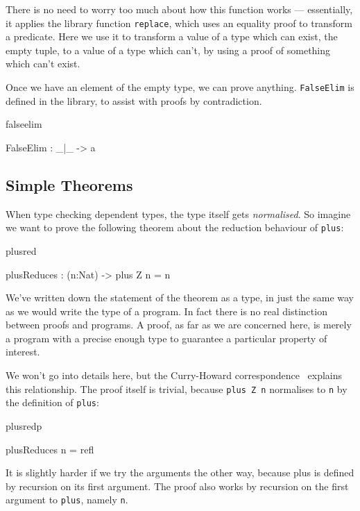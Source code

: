 \noindent
There is no need to worry too much about how this function works --- essentially,
it applies the library function \texttt{replace}, which uses an equality proof to 
transform a predicate. Here we use it to transform a value of a type which can exist,
the empty tuple, to a value of a type which can't, by using a proof of something
which can't exist.

Once we have an element of the empty type, we can prove anything. \texttt{FalseElim}
is defined in the library, to assist with proofs by contradiction.

\begin{SaveVerbatim}{falseelim}

FalseElim : _|_ -> a

\end{SaveVerbatim}

\subsection{Simple Theorems}

When type checking dependent types, the type itself gets \emph{normalised}. So imagine
we want to prove the following theorem about the reduction behaviour of \texttt{plus}:

\begin{SaveVerbatim}{plusred}

plusReduces : (n:Nat) -> plus Z n = n

\end{SaveVerbatim}

\noindent
We've written down the statement of the theorem as a type, in just the same way
as we would write the type of a program. In fact there is no real distinction
between proofs and programs. A proof, as far as we are concerned here, is
merely a program with a precise enough type to guarantee a particular property
of interest.

We won't go into details here, but the Curry-Howard
correspondence~\cite{howard} explains this relationship.
The proof itself is trivial, because \texttt{plus Z n} normalises to \texttt{n}
by the definition of \texttt{plus}:

\begin{SaveVerbatim}{plusredp}

plusReduces n = refl

\end{SaveVerbatim}

\noindent
It is slightly harder if we try the arguments the other way, because plus is
defined by recursion on its first argument. The proof also works by recursion
on the first argument to \texttt{plus}, namely \texttt{n}.

